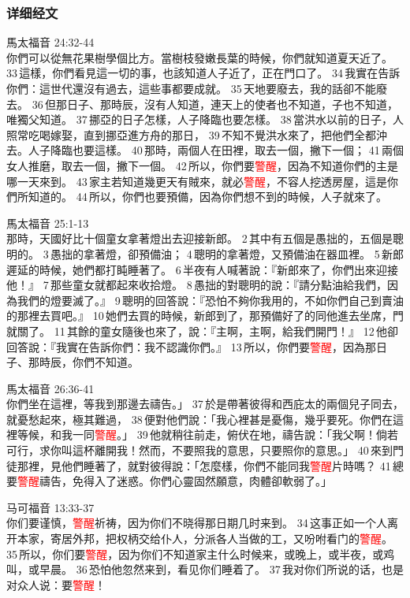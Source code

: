 \subsubsection{详细经文}
馬太福音 24:32-44\\
你們可以從無花果樹學個比方。當樹枝發嫩長葉的時候，你們就知道夏天近了。 33 這樣，你們看見這一切的事，也該知道人子近了，正在門口了。 34 我實在告訴你們：這世代還沒有過去，這些事都要成就。 35 天地要廢去，我的話卻不能廢去。 36 但那日子、那時辰，沒有人知道，連天上的使者也不知道，子也不知道，唯獨父知道。 37 挪亞的日子怎樣，人子降臨也要怎樣。 38 當洪水以前的日子，人照常吃喝嫁娶，直到挪亞進方舟的那日， 39 不知不覺洪水來了，把他們全都沖去。人子降臨也要這樣。 40 那時，兩個人在田裡，取去一個，撇下一個； 41 兩個女人推磨，取去一個，撇下一個。 42 所以，你們要\textcolor{red}{警醒}，因為不知道你們的主是哪一天來到。 43 家主若知道幾更天有賊來，就必\textcolor{red}{警醒}，不容人挖透房屋，這是你們所知道的。 44 所以，你們也要預備，因為你們想不到的時候，人子就來了。

馬太福音 25:1-13\\
那時，天國好比十個童女拿著燈出去迎接新郎。 2 其中有五個是愚拙的，五個是聰明的。 3 愚拙的拿著燈，卻預備油； 4 聰明的拿著燈，又預備油在器皿裡。 5 新郎遲延的時候，她們都打盹睡著了。 6 半夜有人喊著說：『新郎來了，你們出來迎接他！』 7 那些童女就都起來收拾燈。 8 愚拙的對聰明的說：『請分點油給我們，因為我們的燈要滅了。』 9 聰明的回答說：『恐怕不夠你我用的，不如你們自己到賣油的那裡去買吧。』 10 她們去買的時候，新郎到了，那預備好了的同他進去坐席，門就關了。 11 其餘的童女隨後也來了，說：『主啊，主啊，給我們開門！』 12 他卻回答說：『我實在告訴你們：我不認識你們。』 13 所以，你們要\textcolor{red}{警醒}，因為那日子、那時辰，你們不知道。

馬太福音 26:36-41\\
你們坐在這裡，等我到那邊去禱告。」 37 於是帶著彼得和西庇太的兩個兒子同去，就憂愁起來，極其難過， 38 便對他們說：「我心裡甚是憂傷，幾乎要死。你們在這裡等候，和我一同\textcolor{red}{警醒}。」 39 他就稍往前走，俯伏在地，禱告說：「我父啊！倘若可行，求你叫這杯離開我！然而，不要照我的意思，只要照你的意思。」 40 來到門徒那裡，見他們睡著了，就對彼得說：「怎麼樣，你們不能同我\textcolor{red}{警醒}片時嗎？ 41 總要\textcolor{red}{警醒}禱告，免得入了迷惑。你們心靈固然願意，肉體卻軟弱了。」


马可福音 13:33-37\\
你们要谨慎，\textcolor{red}{警醒}祈祷，因为你们不晓得那日期几时来到。 34 这事正如一个人离开本家，寄居外邦，把权柄交给仆人，分派各人当做的工，又吩咐看门的\textcolor{red}{警醒}。 35 所以，你们要\textcolor{red}{警醒}，因为你们不知道家主什么时候来，或晚上，或半夜，或鸡叫，或早晨。 36 恐怕他忽然来到，看见你们睡着了。 37 我对你们所说的话，也是对众人说：要\textcolor{red}{警醒}！

